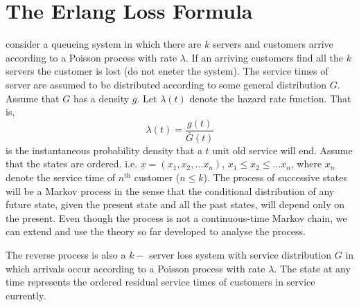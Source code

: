 \documentclass[a4paper,10pt,english]{article}
\begin{document}
\section{The Erlang Loss Formula}
consider a queueing system in which there are $k$ servers and customers arrive according to a Poisson process with rate $\lambda$. If an arriving customers find all the $k$ servers the customer is lost (do not eneter the system). The service times of server are assumed to be distributed according to some general distribution $G$. Assume that $G$ has a density $g$. Let $\lambda(t)$ denote the hazard rate function. That is,
\begin{equation*}
\lambda(t)=\frac{g(t)}{\bar{G}(t)}
\end{equation*}
is the instantaneous probability density that a $t$ unit old service will end. Assume that the states are ordered. i.e. $\underline{x}=(x_1,x_2, \hdots x_n)$, $x_1 \leq x_2 \leq \hdots x_n$, where $x_n$ denote the service time of $n^{\text{th}}$ customer ($n \leq k$). The process of successive states will be a Markov process in the sense that the conditional distribution of any future state, given the present state and all the past states, will depend only on the present. Even though the process is not a continuous-time Markov chain, we can extend and use the theory so far developed to analyse the process.
\begin{cor}
The reverse process is also a $k-$ server loss system with service distribution $G$ in which arrivals occur according to a Poisson process with rate $\lambda$. The state at any time represents the ordered residual service times of customers in service currently.
\end{cor}  
\end{document}
